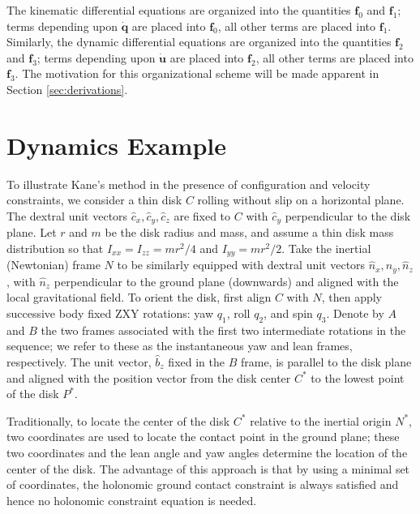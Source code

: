 \documentclass[smallcondensed,final]{svjour3}                     %
\begin{document}
The kinematic differential equations are organized into the quantities
$\mathbf{f}_0$ and $\mathbf{f}_1$; terms depending upon $\dot{\mathbf{q}}$ are
placed into $\mathbf{f}_0$, all other terms are placed into $\mathbf{f}_1$.
Similarly, the dynamic differential equations are organized into the
quantities $\mathbf{f}_2$ and $\mathbf{f}_3$; terms depending upon
$\dot{\mathbf{u}}$ are placed into $\mathbf{f}_2$, all other terms are placed
into $\mathbf{f}_3$. The motivation for this organizational scheme will be made
apparent in Section \ref{sec:derivations}.


\section{Dynamics Example}
\label{sec:example}
To illustrate Kane's method in the presence of configuration and velocity
constraints, we consider a thin disk $C$ rolling without slip on a horizontal
plane. The dextral unit vectors $\hat{c}_x, \hat{c}_y, \hat{c}_z$ are fixed to $C$
with $\hat{c}_y$ perpendicular to the disk plane. Let $r$ and $m$ be the
disk radius and mass, and assume a thin disk mass distribution so that
$I_{xx}=I_{zz}=mr^2/4$ and $I_{yy} = mr^2/2$. Take the inertial (Newtonian)
frame $N$ to be similarly equipped with dextral unit vectors $\hat{n}_x,
\hat{n}_y, \hat{n}_z$, with $\hat{n}_z$ perpendicular to the ground plane
(downwards) and aligned with the local gravitational field. To orient the disk,
first align $C$ with $N$, then apply successive body fixed ZXY rotations:
yaw $q_1$, roll $q_2$, and spin $q_3$.  Denote by $A$ and $B$ the two frames
associated with the first two intermediate rotations in the sequence; we refer
to these as the instantaneous yaw and lean frames, respectively. The unit
vector, $\hat{b}_z$ fixed in the $B$ frame, is parallel to the disk plane and
aligned with the position vector from the disk center $C^*$ to the lowest point
of the disk $P^*$.

Traditionally, to locate the center of the disk $C^*$ relative to the inertial
origin $N^*$, two coordinates are used to locate the contact point in the
ground plane; these two coordinates and the lean angle and yaw angles determine
the location of the center of the disk. The advantage of this approach is that
by using a minimal set of coordinates, the holonomic ground contact constraint
is always satisfied and hence no holonomic constraint equation is needed.
\end{document}
